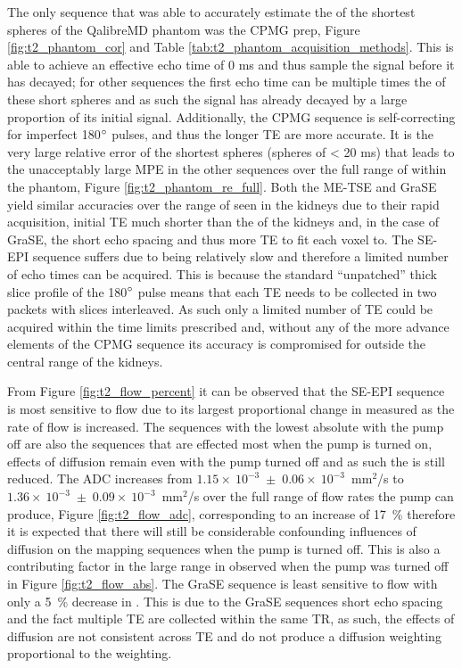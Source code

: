 The only sequence that was able to accurately estimate the \ttwo of the shortest \ttwo spheres of the QalibreMD phantom was the \ac{CPMG} \ttwo prep, Figure \ref{fig:t2_phantom_cor} and Table \ref{tab:t2_phantom_acquisition_methods}. This is able to achieve an effective echo time of 0 ms and thus sample the signal before it has decayed; for other sequences the first echo time can be multiple times the \ttwo of these short spheres and as such the signal has already decayed by a large proportion of its initial signal. Additionally, the \ac{CPMG} sequence is self-correcting for imperfect 180$\degree$ pulses, and thus the longer \ac{TE} are more accurate. It is the very large relative error of the shortest \ttwo spheres (spheres of \ttwo < 20 ms) that leads to the unacceptably large \ac{MPE} in the other sequences over the full range of \ttwo within the phantom, Figure \ref{fig:t2_phantom_re_full}. Both the \ac{ME-TSE} and \ac{GraSE} yield similar accuracies over the range of \ttwo seen in the kidneys due to their rapid acquisition, initial \ac{TE} much shorter than the \ttwo of the kidneys and, in the case of \ac{GraSE}, the short echo spacing  and thus more \ac{TE} to fit each voxel to. The \ac{SE}-\ac{EPI} sequence suffers due to being relatively slow and therefore a limited number of echo times can be acquired. This is because the standard ``unpatched'' thick slice profile of the 180$\degree$ pulse means that each \ac{TE} needs to be collected in two packets with slices interleaved. As such only a limited number of \ac{TE} could be acquired within the time limits prescribed and, without any of the more advance elements of the \ac{CPMG} sequence its accuracy is compromised for \ttwo outside the central range of the kidneys. 

From Figure \ref{fig:t2_flow_percent} it can be observed that the \ac{SE}-\ac{EPI} sequence is most sensitive to flow due to its largest proportional change in measured \ttwo as the rate of flow is increased.  The sequences with the lowest absolute \ttwo with the pump off are also the sequences that are effected most when the pump is turned on, effects of diffusion remain even with the pump turned off and as such the \ttwo is still reduced. The \ac{ADC} increases from $1.15\times~10^{-3}$~$\pm$~$0.06\times~10^{-3}$~mm$^2$/s to $1.36\times~10^{-3}$~$\pm$~$0.09\times~10^{-3}$~mm$^2$/s over the full range of flow rates the pump can produce, Figure \ref{fig:t2_flow_adc}, corresponding to an increase of 17~\% therefore it is expected that there will still be considerable confounding influences of diffusion on the \ttwo mapping sequences when the pump is turned off. This is also a contributing factor in the large range in \ttwo observed when the pump was turned off in Figure \ref{fig:t2_flow_abs}. The \ac{GraSE} sequence is least sensitive to flow with only a 5~\% decrease in \ttwo. This is due to the \ac{GraSE} sequences short echo spacing and the fact multiple \ac{TE} are collected within the same \ac{TR}, as such, the effects of diffusion are not consistent across \ac{TE} and do not produce a diffusion weighting proportional to the \ttwo weighting.

